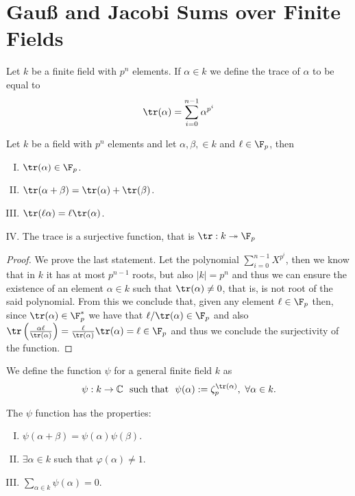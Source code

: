 \section{Gau{\ss} and Jacobi Sums over Finite Fields}

\begin{definition}[Trace]
   Let \(k\) be a finite field with \(p^n\) elements. If  \(\alpha \in k\) we
   define the trace of \(\alpha\) to be equal to
   \[
      \tr(\alpha) = \sum_{i=0}^{n-1} \alpha^{p^{i}}
   \] 
\end{definition}

\begin{proposition}
   Let \(k\) be a field with  \(p^n\) elements and let \(\alpha, \beta, \in k\)
   and \(\ell \in \F_p\), then
   \begin{enumerate}[I.]
      \item \(\tr(\alpha) \in \F_p\).
      \item \(\tr(\alpha + \beta) = \tr(\alpha) + \tr(\beta)\).
      \item \(\tr(\ell\alpha) = \ell \tr(\alpha)\).
      \item The trace is a surjective function, that is \( \tr : k
         \twoheadrightarrow \F_p \) 
   \end{enumerate}
\end{proposition}

\begin{proof}
   We prove the last statement. Let the polynomial \(\sum_{i=0}^{n-1} X^{p^i}\),
   then we know that in \(k\) it has at most \(p^{n-1}\) roots, but also  \(|k|
   = p^n\) and thus we can ensure the existence of an element \(\alpha \in
   k\) such that \(\tr(\alpha) \neq 0\), that is, is not root of the said
   polynomial. From this we conclude that, given any element \(\ell \in \F_p\)
   then, since \(\tr(\alpha) \in \F_p^\ast\) we have that \(\ell/\tr(\alpha) \in
   \F_p\) and also \(\tr\left( \frac{\alpha\ell}{\tr(\alpha)} \right) =
   \frac{\ell}{\tr(\alpha)}\tr(\alpha) = \ell \in \F_p \) and thus we conclude
   the surjectivity of the function.
\end{proof}

\begin{definition}
   We define the function \(\psi\) for a general finite field \(k\) as
    \[
       \psi:k \to \mathbb{C}\ \text{ such that }\ \psi(\alpha) :=
       \zeta_p^{\tr(\alpha)},\  \forall \alpha \in k.
   \] 
\end{definition}

\begin{proposition}
   The \(\psi\) function has the properties:
   \begin{enumerate}[I.]
      \item \(\psi(\alpha + \beta) = \psi(\alpha)\psi(\beta)\).
      \item \(\exists \alpha \in k\) such that \(\varphi(\alpha) \neq 1\).
      \item \(\sum_{\alpha \in k} \psi(\alpha) = 0\).
   \end{enumerate}
\end{proposition}

